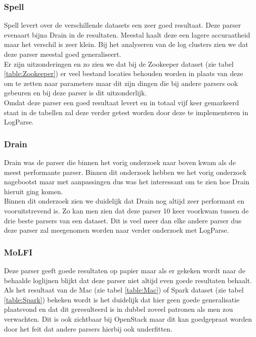 \subsubsection{Spell}
Spell levert over de verschillende datasets een zeer goed resultaat. Deze parser evenaart bijna Drain in de resultaten. Meestal haalt deze een lagere accuraatheid maar het verschil is zeer klein. Bij het analyseren van de log clusters zien we dat deze parser meestal goed generaliseert.\\

Er zijn uitzonderingen en zo zien we dat bij de Zookeeper dataset (zie tabel \ref{table:Zookeeper}) er veel bestand locaties behouden worden in plaats van deze om te zetten naar parameters maar dit zijn dingen die bij andere parsers ook gebeuren en bij deze parser is dit uitzonderlijk.\\

Omdat deze parser een goed resultaat levert en in totaal vijf keer gemarkeerd staat in de tabellen zal deze verder getest worden door deze te implementeren in LogParse.

\subsubsection{Drain}
Drain was de parser die binnen het vorig onderzoek naar boven kwam als de meest performante parser. Binnen dit onderzoek hebben we het vorig onderzoek nagebootst maar met aanpassingen dus was het interessant om te zien hoe Drain hieruit ging komen.\\

Binnen dit onderzoek zien we duidelijk dat Drain nog altijd zeer performant en vooruitstrevend is. Zo kan men zien dat deze parser 10 keer voorkwam tussen de drie beste parsers van een dataset. Dit is veel meer dan elke andere parser dus deze parser zal meegenomen worden naar verder onderzoek met LogParse.

\subsubsection{MoLFI}
Deze parser geeft goede resultaten op papier maar als er gekeken wordt naar de behaalde loglijnen blijkt dat deze parser niet altijd even goede resultaten behaalt. Als het resultaat van de Mac (zie tabel \ref{table:Mac}) of Spark dataset (zie tabel \ref{table:Spark}) bekeken wordt is het duidelijk dat hier geen goede generalisatie plaatsvond en dat dit geresulteerd is in dubbel zoveel patronen als men zou verwachten. Dit is ook zichtbaar bij OpenStack maar dit kan goedgepraat worden door het feit dat andere parsers hierbij ook underfitten.\\

